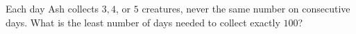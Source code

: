 Each day Ash collects $3,4$, or $5$ creatures, never the same number on consecutive days. What is the least number of days needed to collect exactly $100$?
